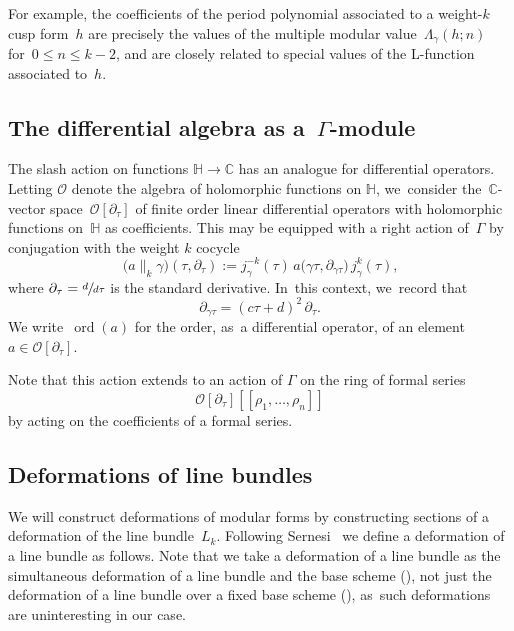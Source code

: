 \documentclass[10pt,a4paper]{article}
\numberwithin{equation}{section}
\theoremstyle{plain}
\theoremstyle{definition}
\newcommand{\tx}{\text}
\newcommand{\nbd}{\nobreakdash-\hspace{0pt}}
\newcommand{\texpdf}[2]{\texorpdfstring{#1}{#2}}
\newcommand{\bbC}{\ensuremath{\mathbb{C}}}
\newcommand{\cO}{\ensuremath{\mathcal{O}}}
\newcommand{\defeq}{:=}
\newcommand{\llbrkt}{[\![}
\newcommand{\rrbrkt}{]\!]}
\newcommand{\HS}{\ensuremath{\mathbb{H}}}
\let\Ga\Gamma
\let\ga\gamma
\newcommand{\ord}{\operatorname{ord}}
\begin{document}
For example, the coefficients of the period polynomial associated to a weight\nbd{}$k$ cusp form~$h$ are precisely the values of the multiple modular value~$\Lambda_{\ga}(h;n)$ for~$0 \le n \le k-2$, and are closely related to special values of the L-function associated to~$h$.

\subsection{The differential algebra as a~\texpdf{$\Ga$}{Gamma}-module}
\label{ssec:preliminaries:differential_algebras}

The slash action on functions \hbox{$\HS \to \bbC$} has an analogue for differential operators. Letting $\cO$ denote the algebra of holomorphic functions on $\HS$, we~consider the~$\bbC$\nbd{}vector space~$\cO[\partial_\tau]$ of finite order linear differential operators with holomorphic functions on~$\HS$ as coefficients. This may be equipped with a right action of~$\Ga$ by conjugation with the weight $k$ cocycle
\begin{equation}
\label{eq:def:double_slash_action}
\bigl(a \big\|_k \ga \bigr) (\tau, \partial_\tau)
\defeq
j^{-k}_\ga(\tau)\,
a\bigl(\ga \tau, \partial_{\ga \tau} \bigr)\,
j^k_\ga(\tau)
\tx{,}
\end{equation}
where $\partial_\tau= \sfrac{d}{d\tau}$ is the standard derivative. In~this context, we~record that
\begin{equation*}
\partial_{\ga \tau}
=
(c \tau + d)^2\,
\partial_\tau
\tx{.}
\end{equation*}
We write~$\ord(a)$ for the order, as~a differential operator, of an element~$a\in\cO[\partial_\tau]$.

Note that this action extends to an action of $\Ga$ on the ring of formal series
\begin{equation*}
\cO[\partial_\tau]\llbrkt \rho_1, \ldots, \rho_n \rrbrkt
\end{equation*}
by acting on the coefficients of a formal series.

\subsection{Deformations of line bundles}
\label{ssec:preliminaries:deformations}

We will construct deformations of modular forms by constructing sections of a deformation of the line bundle~$L_k$.
Following Sernesi~\cite{sernesi06} we define a deformation of a line bundle as follows. Note that we take a deformation of a line bundle as the simultaneous deformation of a line bundle and the base scheme (\cite[\S 3.3.3]{sernesi06}), not just the deformation of a line bundle over a fixed base scheme (\cite[\S 3.3.1]{sernesi06}), as~such deformations are uninteresting in our case.
\end{document}
